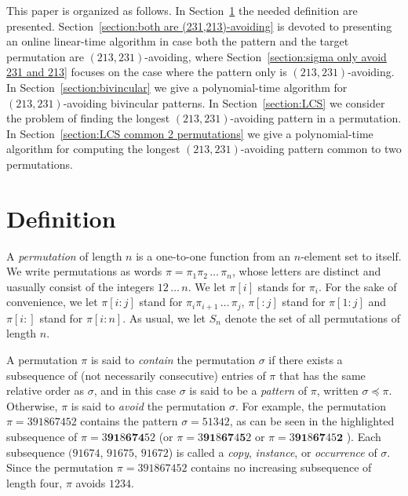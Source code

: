 \documentclass[a4paper]{llncs}
\DeclareMathOperator{\RED}{red}
\begin{document}
	This paper is organized as follows.
	In Section~\ref{section:Definitions} the needed definition are presented.
	Section~\ref{section:both are (231,213)-avoiding} is devoted to presenting 
	an online linear-time algorithm in case both the pattern and the target
	permutation are $(213,231)$-avoiding,
	where Section~\ref{section:sigma only avoid 231 and 213} focuses on the case
	where the pattern only is $(213,231)$-avoiding.
	In Section~\ref{section:bivincular} we give a polynomial-time algorithm
	for $(213,231)$-avoiding bivincular patterns.
	In Section~\ref{section:LCS} we consider the problem of finding the longest
	$(213,231)$-avoiding pattern in a permutation.
	In Section~\ref{section:LCS common 2 permutations} we give a
	polynomial-time algorithm for computing the longest 
	$(213,231)$-avoiding pattern common to two permutations.


\section{Definition}
\label{section:Definitions}

A \emph{permutation} of length $n$ is a one-to-one function from an
$n$-element set to itself.
We write permutations as words
$\pi = \pi_1\pi_2\,\ldots\,\pi_n$, whose letters are distinct
and uasually consist of the integers $12\,\ldots\,n$.
We let
$\pi[i]$ stands for $\pi_i$.
For the sake of convenience, we let
$\pi[i:j]$ stand for
$\pi_i\pi_{i+1}\,\ldots\,\pi_j$,
$\pi[:j]$ stand for $\pi[1:j]$ and
$\pi[i:]$ stand for $\pi[i:n]$.
As usual, we let $S_n$ denote the set of all permutations of length $n$.


A permutation $\pi$ is said to \emph{contain} the permutation $\sigma$
if there exists a subsequence of (not necessarily consecutive)
entries of $\pi$ that has the same relative order as $\sigma$,
and in this case $\sigma$ is said to be a \emph{pattern} of
$\pi$, written $\sigma \preceq \pi$.
Otherwise, $\pi$ is said to \emph{avoid} the permutation $\sigma$.
For example, the permutation $\pi = 391867452$
contains the pattern $\sigma = 51342$,
as can be seen in the highlighted subsequence of
$\pi = 3\mathbf{9}\mathbf{1}8\mathbf{6}\mathbf{7}\mathbf{4}52$
(or
$\pi = 3\mathbf{9}\mathbf{1}8\mathbf{6}\mathbf{7}4\mathbf{5}2$
or
$\pi = 3\mathbf{9}\mathbf{1}8\mathbf{6}\mathbf{7}45\mathbf{2}$
).
Each subsequence $(91674$,
$91675$,
$91672$) is called a
\emph{copy},
\emph{instance}, or
\emph{occurrence} of $\sigma$.
Since the permutation $\pi = 391867452$  contains no increasing subsequence of length four, $\pi$ avoids $1234$.
\end{document}
